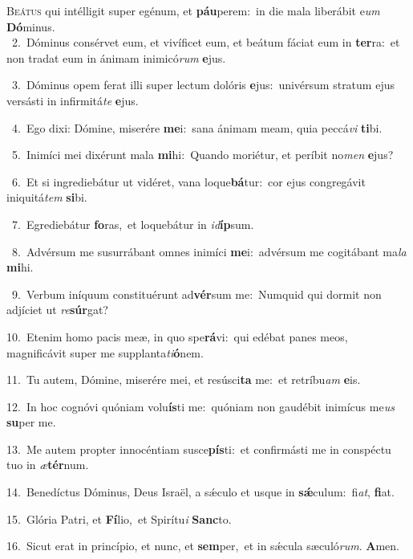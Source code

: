 \lettrine{\initial\textcolor{\initialcolor}{B}}{eátus} qui intélligit super egénum, et \textbf{páu}\-perem:~\star in die mala liberábit e\textit{um} \textbf{Dó}\-minus.\\
{\numbfont\textcolor{\numbcolor}{~2.}}~Dóminus consérvet eum, et vivíficet eum, et beátum fáciat eum in \textbf{ter}\-ra:~\star et non tradat eum in ánimam inimicó\textit{rum} \textbf{e}\-jus.\par
{\numbfont\textcolor{\numbcolor}{~3.}}~Dóminus opem ferat illi super lectum dolóris \textbf{e}\-jus:~\star univérsum stratum ejus versásti in infirmitá\textit{te} \textbf{e}\-jus.\par
{\numbfont\textcolor{\numbcolor}{~4.}}~Ego dixi: Dómine, miserére \textbf{me}\-i:~\star sana ánimam meam, quia peccá\textit{vi} \textbf{ti}\-bi.\par
{\numbfont\textcolor{\numbcolor}{~5.}}~Inimíci mei dixérunt mala \textbf{mi}\-hi:~\star Quando moriétur, et períbit no\textit{men} \textbf{e}\-jus?\par
{\numbfont\textcolor{\numbcolor}{~6.}}~Et si ingrediebátur ut vidéret, vana loque\-\textbf{bá}\-tur:~\star cor ejus congregávit iniquitá\textit{tem} \textbf{si}\-bi.\par
{\numbfont\textcolor{\numbcolor}{~7.}}~Egrediebátur \textbf{fo}\-ras,~\star et loquebátur in \textit{id}\-\textbf{íp}sum.\par
{\numbfont\textcolor{\numbcolor}{~8.}}~Advérsum me susurrábant omnes inimíci \textbf{me}\-i:~\star advérsum me cogitábant ma\textit{la} \textbf{mi}\-hi.\par
{\numbfont\textcolor{\numbcolor}{~9.}}~Verbum iníquum constituérunt ad\-\textbf{vér}\-sum me:~\star Numquid qui dormit non adjíciet ut \textit{re}\-\textbf{súr}gat?\par
{\numbfont\textcolor{\numbcolor}{10.}}~Etenim homo pacis meæ, in quo spe\-\textbf{rá}\-vi:~\star qui edébat panes meos, magnificávit super me supplanta\-\textit{ti}\-\textbf{ó}nem.\par
{\numbfont\textcolor{\numbcolor}{11.}}~Tu autem, Dómine, miserére mei, et resúsci\textbf{ta} me:~\star et retríbu\textit{am} \textbf{e}\-is.\par
{\numbfont\textcolor{\numbcolor}{12.}}~In hoc cognóvi quóniam volu\-\textbf{ís}\-ti me:~\star quóniam non gaudébit inimícus me\textit{us} \textbf{su}\-per me.\par
{\numbfont\textcolor{\numbcolor}{13.}}~Me autem propter innocéntiam susce\-\textbf{pís}\-ti:~\star et confirmásti me in conspéctu tuo in \textit{æ}\-\textbf{tér}num.\par
{\numbfont\textcolor{\numbcolor}{14.}}~Benedíctus Dóminus, Deus Israël, a sǽculo et usque in \textbf{sǽ}\-culum:~\star fi\-\textit{at}\-, \textbf{fi}\-at.\par
{\numbfont\textcolor{\numbcolor}{15.}}~Glória Patri, et \textbf{Fí}\-lio,~\star et Spirítu\textit{i} \textbf{Sanc}\-to.\par
{\numbfont\textcolor{\numbcolor}{16.}}~Sicut erat in princípio, et nunc, et \textbf{sem}\-per,~\star et in sǽcula sæculó\-\textit{rum}\-. \textbf{A}\-men.\par
